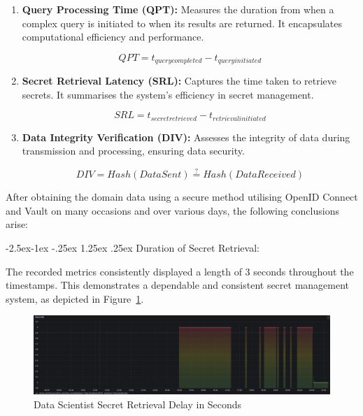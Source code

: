 \documentclass[review]{elsarticle}
\makeatletter
\renewcommand\paragraph{\@startsection{paragraph}{4}{\z@}%
            {-2.5ex\@plus -1ex \@minus -.25ex}%
            {1.25ex \@plus .25ex}%
            {\normalfont\normalsize\itshape}}
\makeatother
\begin{document}
\begin{enumerate}

  \item \textbf{Query Processing Time (QPT):} Measures the duration from when a complex query is initiated to when its results are returned. It encapsulates computational efficiency and performance.

  \begin{equation}
      QPT = t_{query completed} - t_{query initiated}
  \end{equation}

  \item \textbf{Secret Retrieval Latency (SRL):} Captures the time taken to retrieve secrets. It summarises the system's efficiency in secret management.

  \begin{equation}
      SRL = t_{secret retrieved} - t_{retrieval initiated}
  \end{equation}

  \item \textbf{Data Integrity Verification (DIV):} Assesses the integrity of data during transmission and processing, ensuring data security.

  \begin{equation}
      DIV = Hash(Data Sent) \stackrel{?}{=} Hash(Data Received)
  \end{equation}

\end{enumerate}

After obtaining the domain data using a secure method utilising OpenID Connect and Vault on many occasions and over various days, the following conclusions arise:

\paragraph{Duration of Secret Retrieval:}

The recorded metrics consistently displayed a length of 3 seconds throughout the timestamps. This demonstrates a dependable and consistent secret management system, as depicted in Figure~\ref{dataScientistSecretRetrievalDelayInSeconds}.

\begin{figure}[ht]

  \centering

  \includegraphics[width=\textwidth]{images/Secret-Retrieval-Delay-in-Seconds-In-Data-Scientist-Application.png}

  \caption{Data Scientist Secret Retrieval Delay in Seconds }

  \label{dataScientistSecretRetrievalDelayInSeconds}

\end{figure}
\end{document}
